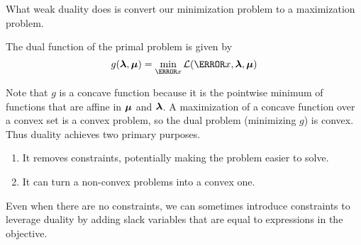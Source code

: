What weak duality does is convert our minimization problem to a maximization problem.
\begin{definition}
	The dual function of the primal problem is given by \[
		g(\bs{\lambda}, \bs{\mu}) = \min_{\V{x}} \mathcal{L}(\V{x}, \bs{\lambda}, \bs{\mu})
	\]
	\label{defn:dual-problem}
\end{definition}
Note that $g$ is a concave function because it is the pointwise minimum of functions that are affine in $\boldsymbol{\mu}$ and $\boldsymbol{\lambda}$.
A maximization of a concave function over a convex set is a convex problem, so the dual problem (minimizing $g$) is convex.
Thus duality achieves two primary purposes.
\begin{enumerate}
	\item It removes constraints, potentially making the problem easier to solve.
	\item It can turn a non-convex problems into a convex one.
\end{enumerate}
Even when there are no constraints, we can sometimes introduce constraints to leverage duality by adding slack variables that are equal to expressions in the objective.
